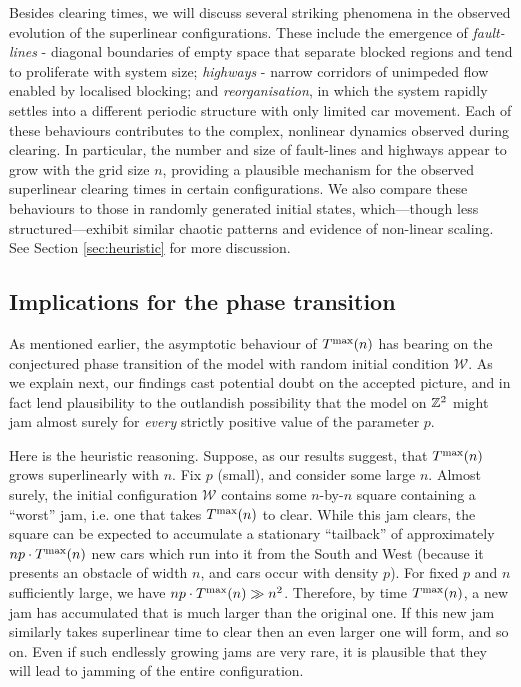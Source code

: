 \documentclass[reqno]{amsart}
\begin{document}
Besides clearing times, we will discuss several striking phenomena in the observed evolution of the superlinear configurations. These include the emergence of \textit{fault-lines} - diagonal boundaries of empty space that separate blocked regions and tend to proliferate with system size; \textit{highways} - narrow corridors of unimpeded flow enabled by localised blocking; and \textit{reorganisation}, in which the system rapidly settles into a different periodic structure with only limited car movement. Each of these behaviours contributes to the complex, nonlinear dynamics observed during clearing. In particular, the number and size of fault-lines and highways appear to grow with the grid size $n$, providing a plausible mechanism for the observed superlinear clearing times in certain configurations. We also compare these behaviours to those in randomly generated initial states, which—though less structured—exhibit similar chaotic patterns and evidence of non-linear scaling. See Section \ref{sec:heuristic} for more discussion.

\subsection*{Implications for the phase transition}

As mentioned earlier, the asymptotic behaviour of $T^{\text{\rm max}}(n)$ has bearing on the conjectured phase transition of the model with random initial condition $\mathcal{W}$.  As we explain next, our findings cast potential doubt on the accepted picture, and in fact lend plausibility to the outlandish possibility that the model on $\mathbb{Z}^2$ might jam almost surely for \emph{every} strictly positive value of the parameter $p$.

Here is the heuristic reasoning. Suppose, as our results suggest, that $T^{\text{\rm max}}(n)$ grows superlinearly with $n$.  Fix $p$ (small), and consider some large $n$.  Almost surely, the initial configuration $\mathcal{W}$ contains some $n$-by-$n$ square containing a ``worst'' jam, i.e. one that takes $T^{\text{\rm max}}(n)$ to clear.  While this jam clears, the square can be expected to accumulate a stationary ``tailback'' of approximately $n p \cdot T^{\text{\rm max}}(n)$ new cars which run into it from the South and West (because it presents an obstacle of width $n$, and cars occur with density $p$).  For fixed $p$ and $n$ sufficiently large, we have $n p \cdot T^{\text{\rm max}}(n) \gg n^2$.  Therefore, by time $T^{\text{\rm max}}(n)$, a new jam has accumulated that is much larger than the original one.  If this new jam similarly takes superlinear time to clear then an even larger one will form, and so on.  Even if such endlessly growing jams are very rare, it is plausible that they will lead to jamming of the entire configuration.
\end{document}
